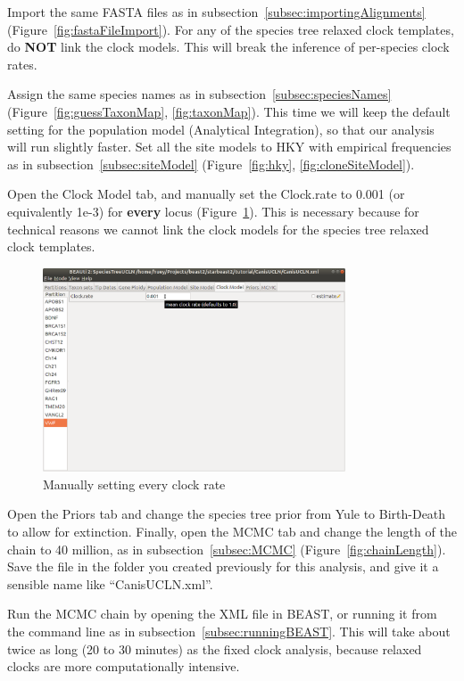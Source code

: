 \documentclass[12pt]{article}
\begin{document}
Import the same FASTA files as in
subsection~\ref{subsec:importingAlignments}
(Figure~\ref{fig:fastaFileImport}). For any of the species tree relaxed clock
templates, do \textbf{NOT} link the clock models. This will break the inference
of per-species clock rates.

Assign the same species names as in
subsection~\ref{subsec:speciesNames} (Figure~\ref{fig:guessTaxonMap}, \ref{fig:taxonMap}). This time
we will keep the default setting for the population model (Analytical Integration), so that our analysis will run slightly faster. Set all
the site models to HKY with empirical frequencies as in
subsection~\ref{subsec:siteModel} (Figure~\ref{fig:hky}, \ref{fig:cloneSiteModel}).

Open the Clock Model tab, and manually set the Clock.rate to 0.001 (or
equivalently 1e-3) for \textbf{every} locus (Figure~\ref{fig:uclnClockRates}).
This is necessary because for technical reasons we cannot link the clock
models for the species tree relaxed clock templates.

\begin{figure}[htb!]
\centering
\includegraphics[width=0.8\textwidth]{figures/uclnClockRates.png}
\caption
{Manually setting every clock rate}
\label{fig:uclnClockRates}
\end{figure}

Open the Priors tab and change the species tree prior from Yule to Birth-Death
to allow for extinction. Finally, open the MCMC tab and change the length of
the chain to 40 million, as in subsection~\ref{subsec:MCMC}
(Figure~\ref{fig:chainLength}). Save the file in the folder you created
previously for this analysis, and give it a sensible name like ``CanisUCLN.xml''.

\newpage{}

Run the MCMC chain by opening the XML file in BEAST, or running it from
the command line as in subsection~\ref{subsec:runningBEAST}. This will
take about twice as long (20 to 30 minutes) as the fixed clock analysis,
because relaxed clocks are more computationally intensive.
\end{document}

